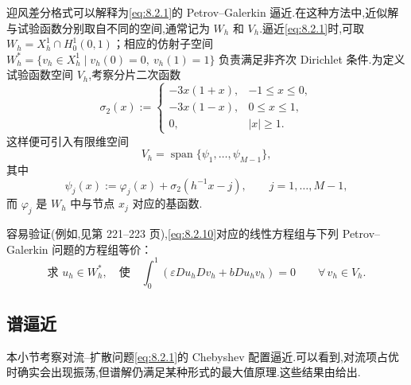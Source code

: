 迎风差分格式可以解释为\eqref{eq:8.2.1}的 Petrov--Galerkin 逼近.在这种方法中,近似解与试验函数分别取自不同的空间,通常记为 \(W_h\) 和 \(V_h\).逼近\eqref{eq:8.2.1}时,可取 \(W_h=X_h^1\cap H_0^1(0,1)\)；相应的仿射子空间 \(W_h^*=\{v_h\in X_h^1\mid v_h(0)=0,\ v_h(1)=1\}\) 负责满足非齐次 Dirichlet 条件.为定义试验函数空间 \(V_h\),考察分片二次函数
\begin{equation}\label{eq:8.2.12}
  \sigma_2(x):=
  \begin{cases}
    -3x(1+x),&-1\le x\le0,\\
    -3x(1-x),&0\le x\le1,\\
    0,&|x|\ge1.
  \end{cases}
\end{equation}
这样便可引入有限维空间
\begin{equation}\label{eq:8.2.13}
  V_h=\operatorname{span}\{\psi_1,\ldots,\psi_{M-1}\},
\end{equation}
其中
\begin{equation}\label{eq:8.2.14}
  \psi_j(x):=\varphi_j(x)+\sigma_2(h^{-1}x-j),\qquad j=1,\ldots,M-1,
\end{equation}
而 \(\varphi_j\) 是 \(W_h\) 中与节点 \(x_j\) 对应的基函数.

容易验证(例如,见第 221–223 页),\eqref{eq:8.2.10}对应的线性方程组与下列 Petrov--Galerkin 问题的方程组等价：
\[
  \text{求 }u_h\in W_h^*,\quad\text{使}\quad
  \int_0^1(\varepsilon Du_hDv_h+bDu_hv_h)=0\qquad\forall\,v_h\in V_h.
\]

\subsection{谱逼近}\label{sec:8.2.3}

本小节考察对流--扩散问题\eqref{eq:8.2.1}的 Chebyshev 配置逼近.可以看到,对流项占优时确实会出现振荡,但谱解仍满足某种形式的最大值原理.这些结果由给出.

